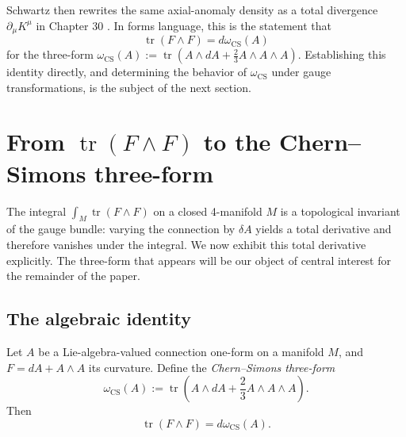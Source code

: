 \documentclass[11pt]{article}
\newcommand{\tr}{\operatorname{tr}}
\newcommand{\CS}{\operatorname{CS}}
\theoremstyle{definition}
\numberwithin{theorem}{section}
\numberwithin{equation}{section}
\let\del\partial
\begin{document}
\medskip

\noindent Schwartz then rewrites the same axial-anomaly density as a total divergence $\del_\mu K^\mu$ in Chapter 30 \cite{Schwartz2014QFT}. In forms language, this is the statement that
\begin{equation*}
\tr(F\wedge F) = d\omega_{\CS}(A)
\end{equation*}
for the three-form $\omega_{\CS}(A) := \tr(A\wedge dA + \frac{2}{3}A\wedge A\wedge A)$. Establishing this identity directly, and determining the behavior of $\omega_{\CS}$ under gauge transformations, is the subject of the next section.

\section{From $\tr(F\wedge F)$ to the Chern--Simons three-form}\label{sec:CS-form}

The integral $\int_M \tr(F\wedge F)$ on a closed 4-manifold $M$ is a topological invariant of the gauge bundle: varying the connection by $\delta A$ yields a total derivative and therefore vanishes under the integral. We now exhibit this total derivative explicitly. The three-form that appears will be our object of central interest for the remainder of the paper.

\subsection{The algebraic identity}

\begin{proposition}\label{prop:CS-form}
Let $A$ be a Lie-algebra-valued connection one-form on a manifold $M$, and $F = dA + A\wedge A$ its curvature. Define the \emph{Chern--Simons three-form}
\begin{equation}\label{eq:CS-form-def}
\omega_{\CS}(A) := \tr\left(A\wedge dA + \frac{2}{3}A\wedge A\wedge A\right).
\end{equation}
Then
\begin{equation}\label{eq:F2-equals-dCS}
\tr(F\wedge F) = d\omega_{\CS}(A).
\end{equation}
\end{proposition}
\end{document}
